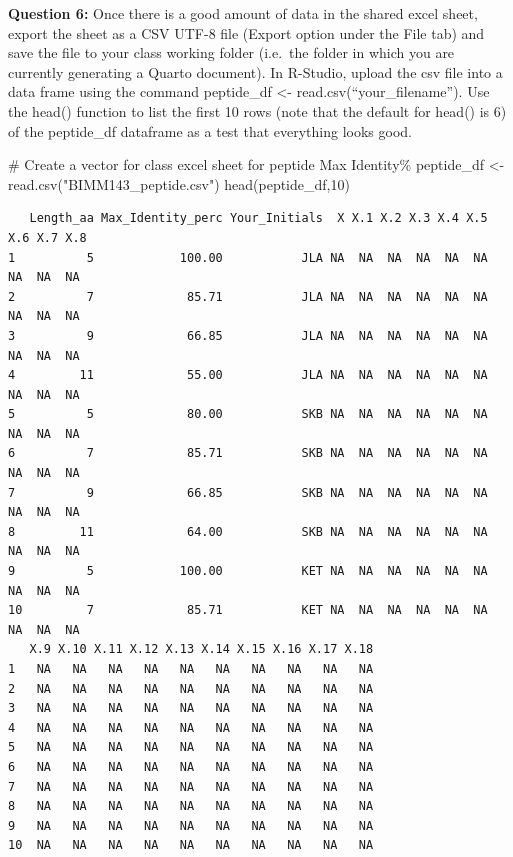 \documentclass[
  letterpaper,
  DIV=11,
  numbers=noendperiod]{scrartcl}
\newenvironment{Shaded}{\begin{snugshade}}{\end{snugshade}}
\newcommand{\CommentTok}[1]{\textcolor[rgb]{0.37,0.37,0.37}{#1}}
\newcommand{\DecValTok}[1]{\textcolor[rgb]{0.68,0.00,0.00}{#1}}
\newcommand{\FunctionTok}[1]{\textcolor[rgb]{0.28,0.35,0.67}{#1}}
\newcommand{\NormalTok}[1]{\textcolor[rgb]{0.00,0.23,0.31}{#1}}
\newcommand{\OtherTok}[1]{\textcolor[rgb]{0.00,0.23,0.31}{#1}}
\newcommand{\StringTok}[1]{\textcolor[rgb]{0.13,0.47,0.30}{#1}}
\begin{document}
\textbf{Question 6:} Once there is a good amount of data in the shared
excel sheet, export the sheet as a CSV UTF-8 file (Export option under
the File tab) and save the file to your class working folder (i.e.~the
folder in which you are currently generating a Quarto document). In
R-Studio, upload the csv file into a data frame using the command
peptide\_df \textless- read.csv(``your\_filename''). Use the head()
function to list the first 10 rows (note that the default for head() is
6) of the peptide\_df dataframe as a test that everything looks good.

\begin{Shaded}
\begin{Highlighting}[]
\CommentTok{\# Create a vector for class excel sheet for peptide Max Identity\% }
\NormalTok{peptide\_df }\OtherTok{\textless{}{-}} \FunctionTok{read.csv}\NormalTok{(}\StringTok{"BIMM143\_peptide.csv"}\NormalTok{)}
\FunctionTok{head}\NormalTok{(peptide\_df,}\DecValTok{10}\NormalTok{)}
\end{Highlighting}
\end{Shaded}

\begin{verbatim}
   Length_aa Max_Identity_perc Your_Initials  X X.1 X.2 X.3 X.4 X.5 X.6 X.7 X.8
1          5            100.00           JLA NA  NA  NA  NA  NA  NA  NA  NA  NA
2          7             85.71           JLA NA  NA  NA  NA  NA  NA  NA  NA  NA
3          9             66.85           JLA NA  NA  NA  NA  NA  NA  NA  NA  NA
4         11             55.00           JLA NA  NA  NA  NA  NA  NA  NA  NA  NA
5          5             80.00           SKB NA  NA  NA  NA  NA  NA  NA  NA  NA
6          7             85.71           SKB NA  NA  NA  NA  NA  NA  NA  NA  NA
7          9             66.85           SKB NA  NA  NA  NA  NA  NA  NA  NA  NA
8         11             64.00           SKB NA  NA  NA  NA  NA  NA  NA  NA  NA
9          5            100.00           KET NA  NA  NA  NA  NA  NA  NA  NA  NA
10         7             85.71           KET NA  NA  NA  NA  NA  NA  NA  NA  NA
   X.9 X.10 X.11 X.12 X.13 X.14 X.15 X.16 X.17 X.18
1   NA   NA   NA   NA   NA   NA   NA   NA   NA   NA
2   NA   NA   NA   NA   NA   NA   NA   NA   NA   NA
3   NA   NA   NA   NA   NA   NA   NA   NA   NA   NA
4   NA   NA   NA   NA   NA   NA   NA   NA   NA   NA
5   NA   NA   NA   NA   NA   NA   NA   NA   NA   NA
6   NA   NA   NA   NA   NA   NA   NA   NA   NA   NA
7   NA   NA   NA   NA   NA   NA   NA   NA   NA   NA
8   NA   NA   NA   NA   NA   NA   NA   NA   NA   NA
9   NA   NA   NA   NA   NA   NA   NA   NA   NA   NA
10  NA   NA   NA   NA   NA   NA   NA   NA   NA   NA
\end{verbatim}
\end{document}
